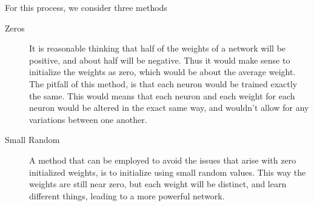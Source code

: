 \documentclass[10pt]{amsart}
\begin{document}
\begin{multicols}{2}
  For this process, we consider three methods
  \begin{description}
    \item[Zeros] It is reasonable thinking that half of the weights of a
      network will be positive, and about half will be negative. Thus it would
      make sense to initialize the weights as zero, which would be about the
      average weight. The pitfall of this method, is that each neuron would be
      trained exactly the same. This would means that each neuron and each
      weight for each neuron would be altered in the exact same way, and
      wouldn't allow for any variations between one another.
    \item[Small Random] A method that can be employed to avoid the issues that
      arise with zero initialized weights, is to initialize using small random
      values. This way the weights are still near zero, but each weight will be
      distinct, and learn different things, leading to a more powerful network.
  \end{description}

\end{multicols}
\end{document}
